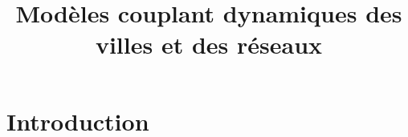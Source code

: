 \documentclass{article}
\title{Modèles couplant dynamiques des villes et des réseaux}
\author{}
\date{}
\begin{document}
\maketitle





\section{Introduction}
\end{document}
